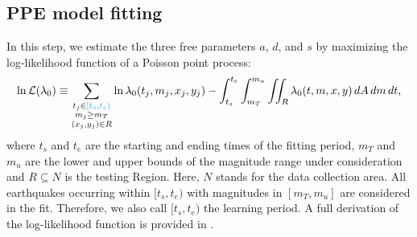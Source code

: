 \documentclass[extra,mreferee]{gji}
\theoremstyle{lemma}
\begin{document}
\subsection{PPE model fitting}

In this step, we estimate the three free parameters $a$, $d$, and $s$ by maximizing the log-likelihood function of a Poisson point process:
\begin{equation}\label{lnL0}
\begin{aligned}
\ln{\mathcal{L}(\lambda_0)} \equiv \sum_{\substack{t_j \in \textcolor{cyan}{[t_s,t_e)}\\ m_j \geq m_T\\ (x_j,y_j)\in R}} \ln{\lambda_0(t_j,m_j,x_j,y_j)}
- \int_{t_s}^{t_e}\int_{m_T}^{m_u}\iint_{R} \lambda_0(t,m,x,y)\, dA\, dm\, dt,
\end{aligned}
\end{equation}
where $t_s$ and $t_e$ are the starting and ending times of the fitting period, $m_T$ and $m_u$ are the lower and upper bounds of the magnitude range under consideration and $R \subseteq  N$ is the testing Region. Here, $N$ stands for the data collection area. All earthquakes occurring within $[t_s, t_e)$ with magnitudes in $[m_T, m_u]$ are considered in the fit. Therefore, we also call $[t_s,t_e)$ the learning period. A full derivation of the log-likelihood function is provided in .
\end{document}
